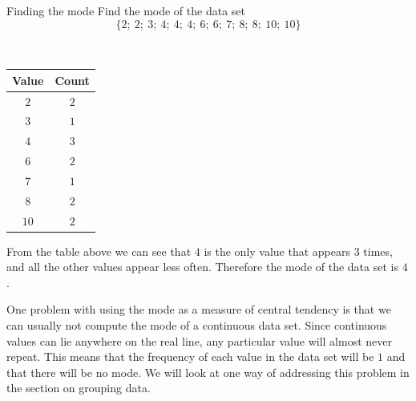 \begin{wex}{Finding the mode}{
    Find the mode of the data set
    \begin{equation*}
      \{2;\ 2;\ 3;\ 4;\ 4;\ 4;\ 6;\ 6;\ 7;\ 8;\ 8;\ 10;\ 10\}
    \end{equation*}
}{
\\
  \begin{center}
    \begin{tabular}{|c|c|} \hline
      \textbf{Value} & \textbf{Count} \\ \hline

      $2$ & $2$ \\ \hline
      $3$ & $1$ \\\hline 
      $4$ & $3$ \\\hline
      $6$ & $2$ \\\hline
      $7$ & $1$ \\\hline
      $8$ & $2$ \\\hline
      $10$ & $2$ \\\hline

    \end{tabular}
  \end{center}


  From the table above we can see that $4$ is the only value that
  appears $3$ times, and all the other values appear less
  often. Therefore the mode of the data set is $4$.

}
\end{wex}

One problem with using the mode as a measure of central tendency is
that we can usually not compute the mode of a continuous data
set. Since continuous values can lie anywhere on the real line, any
particular value will almost never repeat. This means that the
frequency of each value in the data set will be $1$ and that there will
be no mode. We will look at one way of addressing this problem in
the section
on grouping data.

